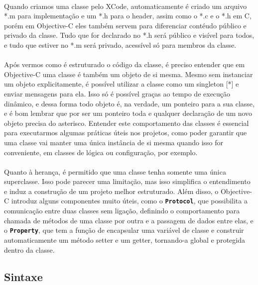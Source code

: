 \documentclass[a4paper,12pt,brazil,doubleside]{book}
\begin{document}
\paragraph{}Quando criamos uma classe pelo XCode, automaticamente é criado um arquivo *.m para implementação e um *.h para o header, assim como o *.c e o *.h em C, porém em Objective-C eles também servem para diferenciar contéudo público e privado da classe. Tudo que for declarado no *.h será público e visível para todos, e tudo que estiver no *.m será privado, acessível só para membros da classe.\\

\paragraph{}Após vermos como é estruturado o código da classe, é preciso entender que em Objective-C uma classe é também um objeto de si mesma. Mesmo sem instanciar um objeto explicitamente, é possível utilizar a classe como um singleton [*] e enviar mensagens para ela. Isso só é possível graças ao tempo de execução dinâmico, e dessa forma todo objeto é, na verdade, um ponteiro para a sua classe, e é bom lembrar que por ser um ponteiro toda e qualquer declaração de um novo objeto precisa do asterisco. Entender este comportamento das classes é essencial para executarmos algumas práticas úteis nos projetos, como poder garantir que uma classe vai manter uma única instância de si mesma quando isso for conveniente, em classes de lógica ou configuração, por exemplo.
\paragraph{}Quanto à herança, é permitido que uma classe tenha somente uma única superclasse. Isso pode parecer uma limitação, mas isso simplifica o entendimento e induz a construção de um projeto melhor estruturado. Além disso, o Objective-C introduz alguns componentes muito úteis, como o \texttt{\textbf{Protocol}}, que possibilita a comunicação entre duas classes sem ligação, definindo o comportamento para chamada de métodos de uma classe por outra e a passagem de dados entre elas, e o \texttt{\textbf{Property}}, que tem a função de encapsular uma variável de classe e construir automaticamente um método setter e um getter, tornando-a global e protegida dentro da classe.

\bigskip 

\subsection{Sintaxe}
\end{document}
